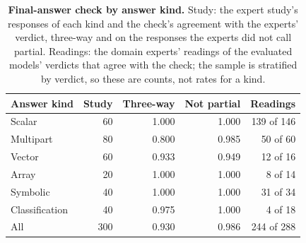 \begin{table}[t]
    \centering
    \small
    \setlength{\tabcolsep}{4pt}
    \begin{tabular}{@{}l r r r r@{}}
        \toprule
        \rowcolor{gray!10}
        \textbf{Answer kind} & \textbf{Study} & \textbf{Three-way} & \textbf{Not partial} & \textbf{Readings} \\
        \midrule
        Scalar & 60 & 1.000 & 1.000 & 139 of 146 \\
        Multipart & 80 & 0.800 & 0.985 & 50 of 60 \\
        Vector & 60 & 0.933 & 0.949 & 12 of 16 \\
        Array & 20 & 1.000 & 1.000 & 8 of 14 \\
        Symbolic & 40 & 1.000 & 1.000 & 31 of 34 \\
        Classification & 40 & 0.975 & 1.000 & 4 of 18 \\
        \midrule
        All & 300 & 0.930 & 0.986 & 244 of 288 \\
        \bottomrule
    \end{tabular}
    \caption{\textbf{Final-answer check by answer kind.} Study: the expert study's responses of each kind and
    the check's agreement with the experts' verdict, three-way and on the responses the experts did not call
    partial. Readings: the domain experts' readings of the evaluated models' verdicts that agree with the
    check; the sample is stratified by verdict, so these are counts, not rates for a kind.}
    \label{tab:answer_kinds}
\end{table}

